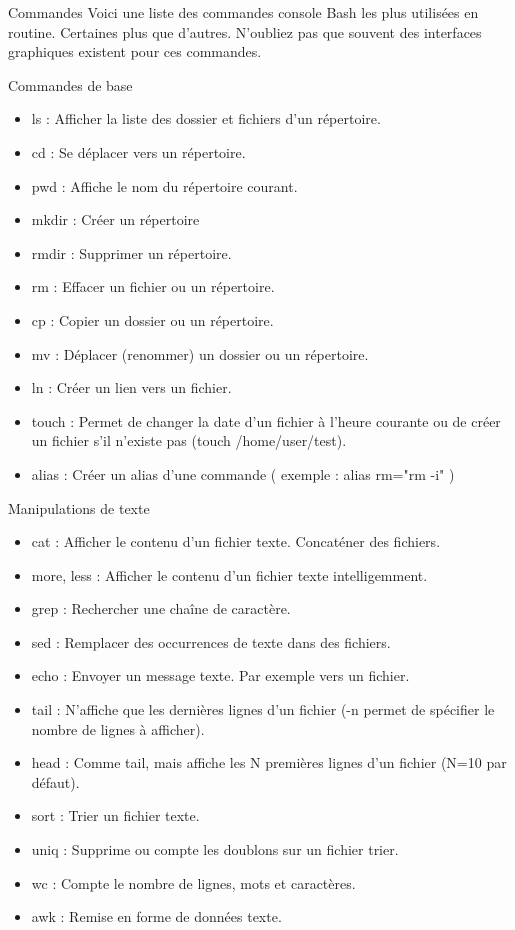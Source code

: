 \documentclass[10pt]{beamer}
\begin{document}
\begin{frame}{Commandes}
Voici une liste des commandes console Bash les plus utilisées en routine. Certaines
plus que d'autres. N'oubliez pas que souvent des interfaces graphiques existent
pour ces commandes.
\end{frame}
\begin{frame}{Commandes de base }
\begin{itemize}
\item \alert{ls} : Afficher la liste des dossier et fichiers d'un répertoire.
\item \alert{cd} : Se déplacer vers un répertoire.
\item \alert{pwd} : Affiche le nom du répertoire courant.
\item \alert{mkdir} : Créer un répertoire
\item \alert{rmdir} : Supprimer un répertoire.
\item \alert{rm} : Effacer un fichier ou un répertoire.
\item \alert{cp} : Copier un dossier ou un répertoire.
\item \alert{mv} : Déplacer (renommer) un dossier ou un répertoire.
\item \alert{ln} : Créer un lien vers un fichier.
\item \alert{touch} : Permet de changer la date d'un fichier à l'heure courante ou de créer un fichier s'il n'existe pas (touch /home/user/test).
\item \alert{alias} : Créer un alias d'une commande ( exemple : alias rm="rm -i" )
\end{itemize}
\end{frame}

\begin{frame}{Manipulations de texte}
\begin{itemize}
\item \alert{cat} : Afficher le contenu d'un fichier texte. Concaténer des fichiers.
\item \alert{more}, less : Afficher le contenu d'un fichier texte intelligemment.
\item \alert{grep} : Rechercher une chaîne de caractère.
\item \alert{sed} : Remplacer des occurrences de texte dans des fichiers.
\item \alert{echo} : Envoyer un message texte. Par exemple vers un fichier.
\item \alert{tail} : N'affiche que les dernières lignes d'un fichier (-n permet de spécifier le nombre de lignes à afficher).
\item \alert{head} : Comme tail, mais affiche les N premières lignes d'un fichier (N=10 par défaut).
\item \alert{sort} : Trier un fichier texte.
\item \alert{uniq} : Supprime ou compte les doublons sur un fichier trier.
\item \alert{wc} : Compte le nombre de lignes, mots et caractères.
\item \alert{awk} : Remise en forme de données texte.
\end{itemize}
\end{frame}
\end{document}
